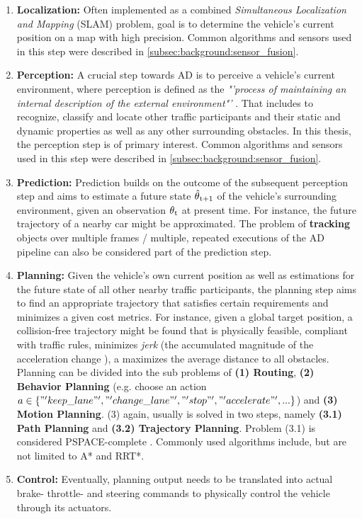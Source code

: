 \begin{enumerate}
	\item \textbf{Localization:} Often implemented as a combined \textit{Simultaneous Localization and Mapping} (SLAM) problem, goal is to determine the vehicle's current position on a map with high precision. Common algorithms and sensors used in this step were described in \autoref{subsec:background:sensor_fusion}.
	\item \textbf{Perception:} A crucial step towards AD is to perceive a vehicle's current environment, where perception is defined as the \textit{"'process of maintaining an internal description of the external environment"'} \cite{Crowley1993}. That includes to recognize, classify and locate other traffic participants and their static and dynamic properties as well as any other surrounding obstacles. In this thesis, the perception step is of primary interest. Common algorithms and sensors used in this step were described in \autoref{subsec:background:sensor_fusion}.
	\item \textbf{Prediction:} Prediction builds on the outcome of the subsequent perception step and aims to estimate a future state $\hat{\theta}\textsubscript{t+1}$ of the vehicle's surrounding environment, given an observation $\theta\textsubscript{t}$ at present time. For instance, the future trajectory of a nearby car might be approximated. The problem of \textbf{tracking} objects over multiple frames / multiple, repeated executions of the AD pipeline can also be considered part of the prediction step. 
	\item \textbf{Planning:} Given the vehicle's own current position as well as estimations for the future state of all other nearby traffic participants, the planning step aims to find an appropriate trajectory that satisfies certain requirements and minimizes a given cost metrics. For instance, given a global target position, a collision-free trajectory might be found that is physically feasible, compliant with traffic rules, minimizes \textit{jerk} (the accumulated magnitude of the acceleration change \cite{paden2016survey}), a maximizes the average distance to all obstacles. Planning can be divided into the sub problems of \textbf{(1) Routing}, \textbf{(2) Behavior Planning} (e.g. choose an action $a \in \{ "'keep\_lane"', "'change\_lane"', "'stop"', "'accelerate"', ... \}$) and \textbf{(3) Motion Planning}. (3) again, usually is solved in two steps, namely \textbf{(3.1) Path Planning} and \textbf{(3.2) Trajectory Planning}. Problem (3.1) is considered PSPACE-complete \cite{paden2016survey}. Commonly used algorithms include, but are not limited to A* and RRT*.
	\item \textbf{Control:} Eventually, planning output needs to be translated into actual brake- throttle- and steering commands to physically control the vehicle through its actuators. 
\end{enumerate}

